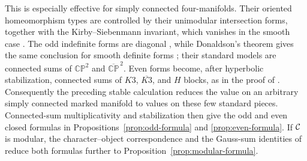 This is especially effective for simply connected four-manifolds.  Their
oriented homeomorphism types are controlled by their unimodular intersection
forms, together with the Kirby--Siebenmann invariant, which vanishes in the
smooth case \cite{Freedman1982}.  The odd indefinite forms are diagonal
\cite[Theorem~2.3.1]{PetersSterk2024}, while Donaldson's theorem gives the same
conclusion for smooth definite forms \cite[Theorem~A]{Donaldson1983}; their
standard models are connected sums of $\mathbb{CP}^2$ and
$\overline{\mathbb{CP}}^{\,2}$.  Even forms become, after hyperbolic
stabilization, connected sums of $K3$, $\overline{K3}$, and $H$ blocks, as in
the proof of \cite[Corollary~3.9]{Reutter2023}.  Consequently the preceding
stable calculation reduces the value on an arbitrary simply connected marked
manifold to values on these few standard pieces.  Connected-sum
multiplicativity and stabilization then give the odd and even closed formulas
in Propositions~\ref{prop:odd-formula} and
\ref{prop:even-formula}.  If $\mathcal{C}$ is modular, the character--object
correspondence and the Gauss-sum identities of
\cite[Lemmas~8.15.3 and~8.22.9, Corollary~8.15.5, and
Proposition~8.15.4]{EGNO2015} reduce both formulas further to
Proposition~\ref{prop:modular-formula}.
